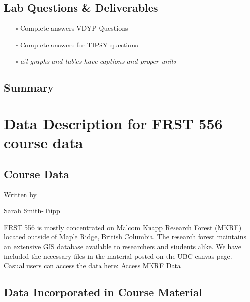 \documentclass[
  letterpaper,
]{book}
\providecommand{\tightlist}{%
  \setlength{\itemsep}{0pt}\setlength{\parskip}{0pt}}\usepackage{longtable,booktabs,array}
\begin{document}
\hypertarget{lab-questions-deliverables-5}{%
\section*{Lab Questions \&
Deliverables}\label{lab-questions-deliverables-5}}


\begin{itemize}
\tightlist
\item[$\square$]
  Complete answers VDYP Questions
\item[$\square$]
  Complete answers for TIPSY questions
\item[$\square$]
  \emph{all graphs and tables have captions and proper units}
\end{itemize}

\hypertarget{summary-5}{%
\section*{Summary}\label{summary-5}}



\hypertarget{data-description-for-frst-556-course-data}{%
\chapter{Data Description for FRST 556 course
data}\label{data-description-for-frst-556-course-data}}

\hypertarget{sec-data}{%
\section{Course Data}\label{sec-data}}

Written by

Sarah Smith-Tripp

FRST 556 is mostly concentrated on Malcom Knapp Research Forest (MKRF)
located outside of Maple Ridge, British Columbia. The research forest
maintains an extensive GIS database available to researchers and
students alike. We have included the necessary files in the material
posted on the UBC canvas page. Casual users can access the data here:
\href{https://www.mkrf.forestry.ubc.ca/education/gis/}{Access MKRF Data}

\hypertarget{data-incorporated-in-course-material}{%
\section{Data Incorporated in Course
Material}\label{data-incorporated-in-course-material}}
\end{document}
